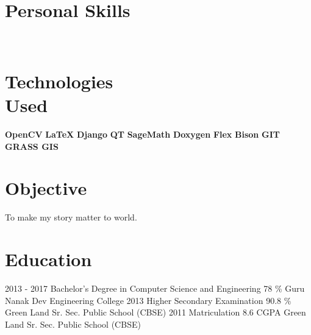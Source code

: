 \documentclass[]{friggeri-cv}
\begin{document}
\begin{aside}
  \section{Personal Skills}
    ~
  \section{Technologies \\ Used}
        \textbf{OpenCV}
        \textbf{LaTeX}
        \textbf{Django}
        \textbf{QT}
        \textbf{SageMath}
        \textbf{Doxygen}
        \textbf{Flex}
        \textbf{Bison}
        \textbf{GIT}
        \textbf{GRASS GIS} 
     ~      
\end{aside}

\section{Objective}
To make my story matter to world.
\section{Education}
\begin{entrylist}
  \entry
    {2013 - 2017}
    {Bachelor's Degree in Computer Science and Engineering}
    {78 \%}
    {Guru Nanak Dev Engineering College}
  \entry
    {2013}
    {Higher Secondary Examination}
    {90.8 \%}
    {Green Land Sr. Sec. Public School (CBSE)}
    \entry
    {2011}
    {Matriculation}
    {8.6 CGPA}
    {Green Land Sr. Sec. Public School (CBSE) }
\end{entrylist}
\end{document}
